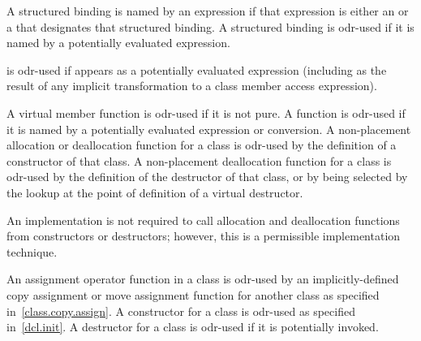\pnum
A structured binding is named by an expression
if that expression is either an  or
a 
that designates that structured binding.
A structured binding is odr-used
if it is named by a potentially evaluated expression.

\pnum
{} is odr-used if  appears as a potentially evaluated expression
(including as the result of any implicit transformation to
a class member access expression).

\pnum
A virtual member
function is odr-used if it is not pure.
A function is odr-used if it is named by
a potentially evaluated expression or conversion.
A non-placement allocation or deallocation
function for a class is odr-used by the definition of a constructor of that
class. A non-placement deallocation function for a class is odr-used by the
definition of the destructor of that class, or by being selected by the
lookup at the point of definition of a virtual
destructor.
\begin{footnote}
An implementation is not required
to call allocation and
deallocation functions from constructors or destructors; however, this
is a permissible implementation technique.
\end{footnote}

\pnum
An assignment operator function in a class is odr-used by an
implicitly-defined
copy assignment or move assignment function for another class as specified
in~\ref{class.copy.assign}.
A constructor for a class is odr-used as specified
in~\ref{dcl.init}. A destructor for a class is odr-used if it is potentially
invoked.

